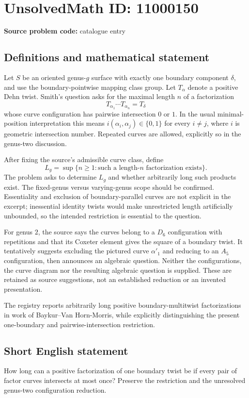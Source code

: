 \documentclass[11pt]{article}
\begin{document}
\section*{UnsolvedMath ID: 11000150}
\textbf{Source problem code:} catalogue entry
\subsection{Definitions and mathematical statement}
Let $S$ be an oriented genus-$g$ surface with exactly one boundary component $\delta$, and use the boundary-pointwise mapping class group. Let $T_\alpha$ denote a positive Dehn twist. Smith's question asks for the maximal length $n$ of a factorization
\[
 T_{\alpha_1}\cdots T_{\alpha_n}=T_\delta
\]
whose curve configuration has pairwise intersection $0$ or $1$. In the usual minimal-position interpretation this means $i(\alpha_i,\alpha_j)\in\{0,1\}$ for every $i\ne j$, where $i$ is geometric intersection number. Repeated curves are allowed, explicitly so in the genus-two discussion.

After fixing the source's admissible curve class, define
\[
 L_g=\sup\{n\geq1:\text{such a length-}n\text{ factorization exists}\}.
\]
The problem asks to determine $L_g$ and whether arbitrarily long such products exist. The fixed-genus versus varying-genus scope should be confirmed. Essentiality and exclusion of boundary-parallel curves are not explicit in the excerpt; inessential identity twists would make unrestricted length artificially unbounded, so the intended restriction is essential to the question.

For genus $2$, the source says the curves belong to a $D_6$ configuration with repetitions and that its Coxeter element gives the square of a boundary twist. It tentatively suggests excluding the pictured curve $\alpha'_1$ and reducing to an $A_5$ configuration, then announces an algebraic question. Neither the configurations, the curve diagram nor the resulting algebraic question is supplied. These are retained as source suggestions, not an established reduction or an invented presentation.

The registry reports arbitrarily long positive boundary-multitwist factorizations in work of Baykur--Van Horn-Morris, while explicitly distinguishing the present one-boundary and pairwise-intersection restriction.
\subsection{Short English statement}
How long can a positive factorization of one boundary twist be if every pair of factor curves intersects at most once? Preserve the restriction and the unresolved genus-two configuration reduction.
\end{document}
